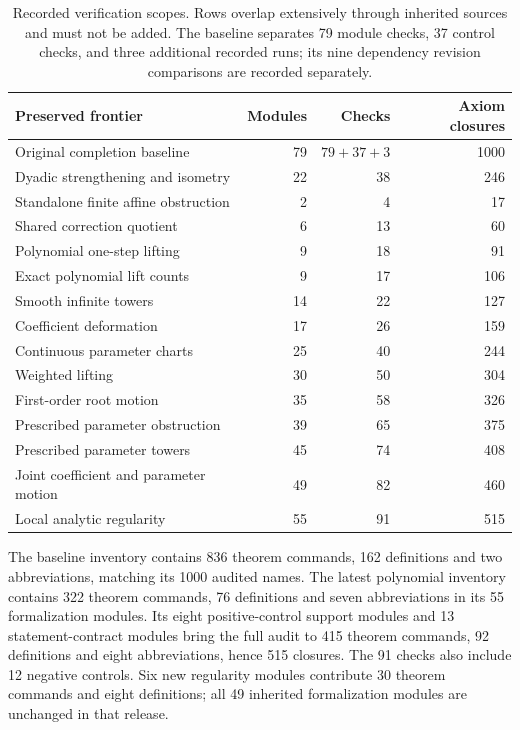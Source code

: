 \begin{table}[htbp]
\centering
\small
\begin{tabular}{@{}lrrr@{}}
\toprule
Preserved frontier & Modules & Checks & Axiom closures\\
\midrule
Original completion baseline & 79 & $79+37+3$ & 1000\\
Dyadic strengthening and isometry & 22 & 38 & 246\\
Standalone finite affine obstruction & 2 & 4 & 17\\
Shared correction quotient & 6 & 13 & 60\\
Polynomial one-step lifting & 9 & 18 & 91\\
Exact polynomial lift counts & 9 & 17 & 106\\
Smooth infinite towers & 14 & 22 & 127\\
Coefficient deformation & 17 & 26 & 159\\
Continuous parameter charts & 25 & 40 & 244\\
Weighted lifting & 30 & 50 & 304\\
First-order root motion & 35 & 58 & 326\\
Prescribed parameter obstruction & 39 & 65 & 375\\
Prescribed parameter towers & 45 & 74 & 408\\
Joint coefficient and parameter motion & 49 & 82 & 460\\
Local analytic regularity & 55 & 91 & 515\\
\bottomrule
\end{tabular}
\caption{Recorded verification scopes. Rows overlap extensively through
inherited sources and must not be added. The baseline separates 79 module
checks, 37 control checks, and three additional recorded runs; its nine
dependency revision comparisons are recorded separately.}
\label{tab:verification-frontiers}
\end{table}

The baseline inventory contains 836 theorem commands, 162 definitions and two
abbreviations, matching its 1000 audited names. The latest polynomial inventory
contains 322 theorem commands, 76 definitions and seven abbreviations in its
55 formalization modules. Its eight positive-control support modules and
13 statement-contract modules bring the full audit to 415 theorem commands,
92 definitions and eight abbreviations, hence 515 closures. The 91 checks also
include 12 negative controls. Six new regularity modules contribute 30 theorem
commands and eight definitions; all 49 inherited formalization modules are
unchanged in that release.

